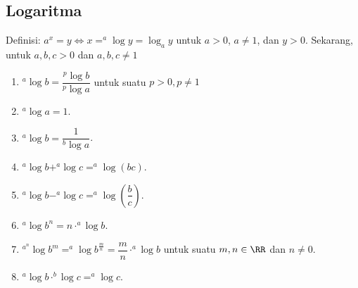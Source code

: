 \subsection{Logaritma}
Definisi: $a^x =y \iff x = ^a \log y = \log_a y$ untuk $a> 0$, $a \neq 1$, dan $y >0$.
Sekarang, untuk $a,b,c > 0$ dan $a,b,c \neq 1$
\begin{enumerate}
    \item $^a \log b = \dfrac{^p \log b}{^p \log a}$ untuk suatu $p>0, p \neq 1$
    \item $^a \log a = 1$.
    \item $^a \log b = \dfrac{1}{^b \log a}$.
    \item $^a \log b + ^a \log c = ^a \log (bc)$.
    \item $^a \log b - ^a \log c = ^a \log \left(\dfrac{b}{c}\right)$.
    \item $^a \log b^n = n \cdot ^a \log b$.
    \item $^{a^n} \log b^m = ^a \log b^{\frac{m}{n}} = \dfrac{m}{n}\cdot ^a \log b$ untuk suatu $m,n \in \RR$ dan $n \neq 0$.
    \item $^a \log b \cdot ^b\log c = ^a \log c$.
\end{enumerate}

